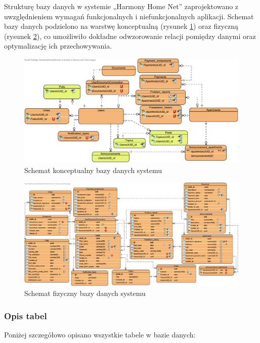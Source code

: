 Strukturę bazy danych w systemie „Harmony Home Net” zaprojektowano z uwzględnieniem wymagań funkcjonalnych i niefunkcjonalnych aplikacji. Schemat bazy danych podzielono na warstwę konceptualną (rysunek \ref{fig:ebok_db_concept}) oraz fizyczną (rysunek \ref{fig:ebok_db_physical}), co umożliwiło dokładne odwzorowanie relacji pomiędzy danymi oraz optymalizację ich przechowywania.
\begin{figure}[ht]
    \centering
    \includegraphics[width=.9\linewidth]{rys03/ebok_db_concept}
    \caption{Schemat konceptualny bazy danych systemu}
    \label{fig:ebok_db_concept}
\end{figure}
\begin{figure}[ht]
    \centering
    \includegraphics[width=1\linewidth]{rys03/ebok_db_physical} %
    \caption{Schemat fizyczny bazy danych systemu}
    \label{fig:ebok_db_physical}
\end{figure}

\subsubsection{Opis tabel}
Poniżej szczegółowo opisano wszystkie tabele w bazie danych:

